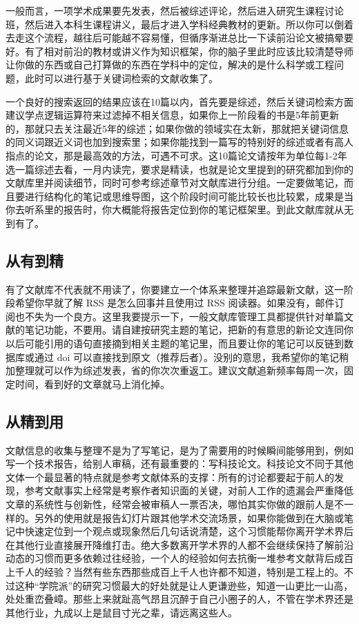 \documentclass[]{tufte-book}
\begin{document}
一般而言，一项学术成果要先发表，然后被综述评论，然后进入研究生课程讨论班，然后进入本科生课程讲义，最后才进入学科经典教材的更新。所以你可以倒着去走这个流程，越往后可能越不容易懂，但循序渐进总比一下读前沿论文被搞晕要好。有了相对前沿的教材或讲义作为知识框架，你的脑子里此时应该比较清楚导师让你做的东西或自己打算做的东西在学科中的定位，解决的是什么科学或工程问题，此时可以进行基于关键词检索的文献收集了。

一个良好的搜索返回的结果应该在10篇以内，首先要是综述，然后关键词检索方面建议学点逻辑运算符来过滤掉不相关信息，如果你上一阶段看的书是5年前更新的，那就只去关注最近5年的综述；如果你做的领域实在太新，那就把关键词信息的同义词跟近义词也加到搜索里；如果你能找到一篇写的特别好的综述或者有高人指点的论文，那是最高效的方法，可遇不可求。这10篇论文请按年为单位每1-2年选一篇综述去看，一月内读完，要求是精读，也就是论文里提到的研究都加到你的文献库里并阅读细节，同时可参考综述章节对文献库进行分组。一定要做笔记，而且要进行结构化的笔记或思维导图，这个阶段时间可能比较长也比较累，成果是当你去听系里的报告时，你大概能将报告定位到你的笔记框架里。到此文献库就从无到有了。

\hypertarget{ux4eceux6709ux5230ux7cbe}{%
\subsection{从有到精}\label{ux4eceux6709ux5230ux7cbe}}

有了文献库不代表就不用读了，你要建立一个体系来整理并追踪最新文献，这一阶段希望你早就了解 RSS 是怎么回事并且使用过 RSS 阅读器。如果没有，邮件订阅也不失为一个良方。这里我要提示一下，一般文献库管理工具都提供针对单篇文献的笔记功能，不要用。请自建按研究主题的笔记，把新的有意思的新论文连同你以后可能引用的语句直接摘到相关主题的笔记里，而且要让你的笔记可以反链到数据库或通过 doi 可以直接找到原文（推荐后者）。没别的意思，我希望你的笔记稍加整理就可以作为综述发表，省的你次次重返工。建议文献追新频率每周一次，固定时间，看到好的文章就马上消化掉。

\hypertarget{ux4eceux7cbeux5230ux7528}{%
\subsection{从精到用}\label{ux4eceux7cbeux5230ux7528}}

文献信息的收集与整理不是为了写笔记，是为了需要用的时候瞬间能够用到，例如写一个技术报告，给别人审稿，还有最重要的：写科技论文。科技论文不同于其他文体一个最显著的特点就是参考文献体系的支撑：所有的讨论都要起于前人的发现，参考文献事实上经常是考察作者知识面的关键，对前人工作的遗漏会严重降低文章的系统性与创新性，经常会被审稿人一票否决，哪怕其实你做的跟前人是不一样的。另外的使用就是报告幻灯片跟其他学术交流场景，如果你能做到在大脑或笔记中快速定位到一个观点或现象然后几句话说清楚，这个习惯能帮你离开学术界后在其他行业直接展开降维打击。绝大多数离开学术界的人都不会继续保持了解前沿动态的习惯而更多依赖过往经验，一个人的经验如何去抗衡一堆参考文献背后成百上千人的经验？当然有些东西那些成百上千人也许都不知道，特别是工程上的。不过这种``学院派''的研究习惯最大的好处就是让人更谦逊些，知道一山更比一山高，处处重峦叠嶂。那些上来就趾高气昂且沉醉于自己小圈子的人，不管在学术界还是其他行业，九成以上是鼠目寸光之辈，请远离这些人。
\end{document}
